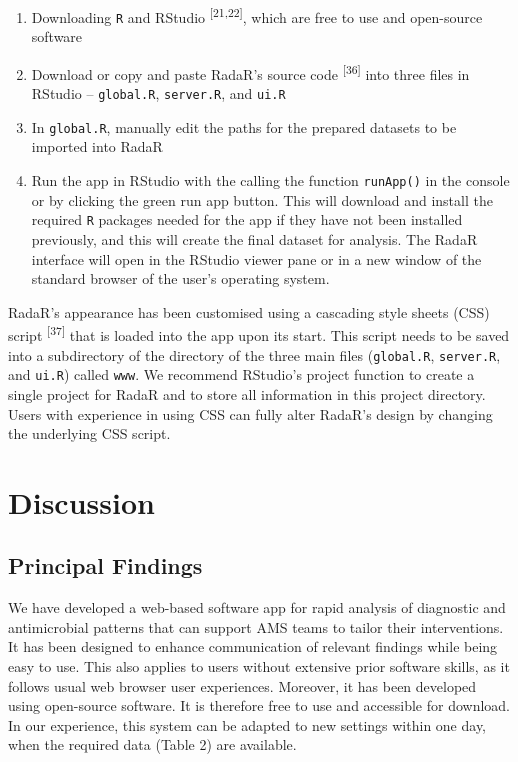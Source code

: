 \documentclass[
]{book}
\providecommand{\tightlist}{%
  \setlength{\itemsep}{0pt}\setlength{\parskip}{0pt}}
\begin{document}
\begin{enumerate}
\def\labelenumi{\arabic{enumi}.}
\tightlist
\item
  Downloading \texttt{R} and RStudio \textsuperscript{{[}21,22{]}}, which are free to use and open-source software
\item
  Download or copy and paste RadaR's source code \textsuperscript{{[}36{]}} into three files in RStudio -- \texttt{global.R}, \texttt{server.R}, and \texttt{ui.R}
\item
  In \texttt{global.R}, manually edit the paths for the prepared datasets to be imported into RadaR
\item
  Run the app in RStudio with the calling the function \texttt{runApp()} in the console or by clicking the green run app button. This will download and install the required \texttt{R} packages needed for the app if they have not been installed previously, and this will create the final dataset for analysis. The RadaR interface will open in the RStudio viewer pane or in a new window of the standard browser of the user's operating system.
\end{enumerate}

RadaR's appearance has been customised using a cascading style sheets (CSS) script \textsuperscript{{[}37{]}} that is loaded into the app upon its start. This script needs to be saved into a subdirectory of the directory of the three main files (\texttt{global.R}, \texttt{server.R}, and \texttt{ui.R}) called \texttt{www}. We recommend RStudio's project function to create a single project for RadaR and to store all information in this project directory. Users with experience in using CSS can fully alter RadaR's design by changing the underlying CSS script.

\hypertarget{discussion-1}{%
\section{Discussion}\label{discussion-1}}

\hypertarget{principal-findings}{%
\subsection{Principal Findings}\label{principal-findings}}

We have developed a web-based software app for rapid analysis of diagnostic and antimicrobial patterns that can support AMS teams to tailor their interventions. It has been designed to enhance communication of relevant findings while being easy to use. This also applies to users without extensive prior software skills, as it follows usual web browser user experiences. Moreover, it has been developed using open-source software. It is therefore free to use and accessible for download. In our experience, this system can be adapted to new settings within one day, when the required data (Table 2) are available.
\end{document}
